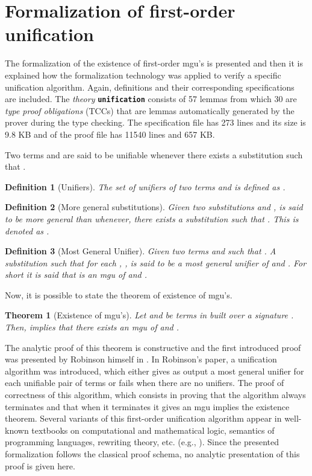 \documentclass[submission,copyright,creativecommons]{eptcs}
\newtheorem{definition}{Definition}
\newtheorem{theorem}{Theorem}
\begin{document}
  \section{Formalization of first-order
    unification}\label{Sec:formalization}

  The formalization of the existence of first-order mgu's is presented
  and then it is explained how the formalization technology was
  applied to verify a specific unification algorithm. Again,
  definitions and their corresponding specifications are included.
  The \emph{theory} {\tt \bf unification} consists of 57 lemmas from
  which 30 are \emph{type proof obligations} (TCCs) that are lemmas
  automatically generated by the prover during the type checking. The
  specification file has 273 lines and its size is 9.8 KB and of the
  proof file has 11540 lines and 657 KB.

  Two terms  and  are said to be unifiable whenever there exists
  a substitution  such that .
  
\begin{definition}[Unifiers]
  The set of unifiers of two terms  and  is defined as .
\end{definition}

\begin{definition}[More general substitutions]
  Given two substitutions  and ,  is said to be
  more general than  whenever, there exists a substitution
   such that .  This is denoted as
  .
\end{definition}

\begin{definition}[Most General Unifier]
  Given two terms  and  such that . A
  substitution  such that for each , , is said to be a most general unifier of  and . For
  short it is said that  is an mgu of  and .
\end{definition}

Now, it is possible to state the theorem of existence of mgu's.
 
\begin{theorem}[Existence of mgu's] 
  Let  and  be terms in  built over a signature . Then,
   implies that there exists an mgu of  and
  .
\end{theorem}

The analytic proof of this theorem is constructive and the first
introduced proof was presented by Robinson himself in \cite{Ro65}. In
Robinson's paper, a unification algorithm was introduced, which either
gives as output a most general unifier for each unifiable pair of
terms or fails when there are no unifiers.  The proof of correctness
of this algorithm, which consists in proving that the algorithm always
terminates and that when it terminates it gives an mgu implies the
existence theorem. Several variants of this first-order unification
algorithm appear in well-known textbooks on computational and
mathematical logic, semantics of programming languages, rewriting
theory, etc. (e.g.,
\cite{Llo87,EbFlTh84,Bu98,Te2003,BaNi98,Hi97}). Since the presented
formalization follows the classical proof schema, no analytic
presentation of this proof is given here.
\end{document}
